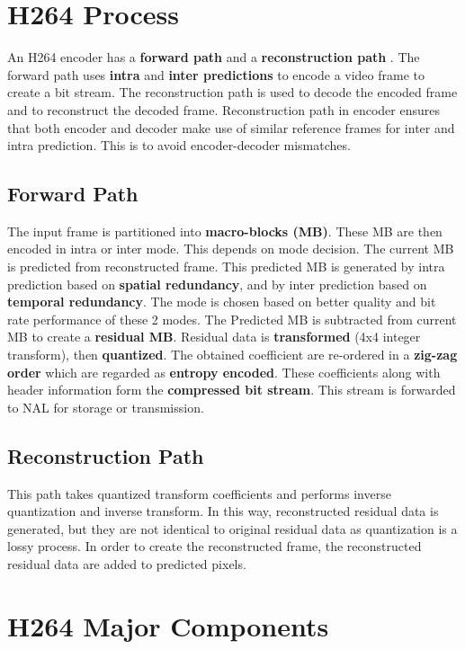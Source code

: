 \section{H264 Process}
An H264 encoder has a \textbf{forward path} and a \textbf{reconstruction path} \cite{sahin2006efficient}. The forward path uses \textbf{intra} and \textbf{inter predictions} to encode a video frame to create a bit stream. The reconstruction path is used to decode the encoded frame and to reconstruct the decoded frame. Reconstruction path in encoder ensures that both encoder and decoder make use of similar reference frames for inter and intra prediction. This is to avoid encoder-decoder mismatches. 

\subsection{Forward Path}
The input frame is partitioned into \textbf{macro-blocks (MB)}. These MB are then encoded in intra or inter mode. This depends on mode decision. The current MB is predicted from reconstructed frame. This predicted MB is generated by intra prediction based on \textbf{spatial redundancy}, and by inter prediction based on \textbf{temporal redundancy}. The mode is chosen based on better quality and bit rate performance of these 2 modes. The Predicted MB is subtracted from current MB to create a \textbf{residual MB}. Residual data is \textbf{transformed} (4x4 integer transform), then \textbf{quantized}. The obtained coefficient are re-ordered in a \textbf{zig-zag order} which are regarded as \textbf{entropy encoded}. These coefficients along with header information form the \textbf{compressed bit stream}. This stream is forwarded to NAL for storage or transmission. 

\subsection{Reconstruction Path}
This path takes quantized transform coefficients and performs inverse quantization and inverse transform. In this way, reconstructed residual data is generated, but they are not identical to original residual data as quantization is a lossy process. In order to create the reconstructed frame, the reconstructed residual data are added to predicted pixels. 


\section{H264 Major Components}

